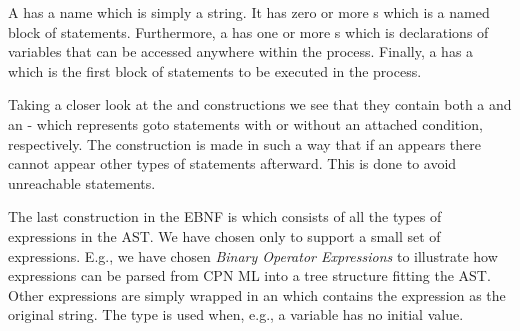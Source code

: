 A  has a name which is simply a string. It has zero or more s which is a named block of statements. Furthermore, a  has one or more s which is declarations of variables that can be accessed anywhere within the process. Finally, a  has a  which is the first block of statements to be executed in the process.

Taking a closer look at the  and  constructions we see that they contain both a  and an - which represents goto statements with or without an attached condition, respectively. The construction is made in such a way that if an  appears there cannot appear other types of statements afterward. This is done to avoid unreachable statements.

The last construction in the EBNF is  which consists of all the types of expressions in the AST. We have chosen only to support a small set of expressions. E.g., we have chosen \emph{Binary Operator Expressions} to illustrate how expressions can be parsed from CPN ML into a tree structure fitting the AST. Other expressions are simply wrapped in an  which contains the expression as the original string. The type  is used when, e.g., a variable has no initial value.
